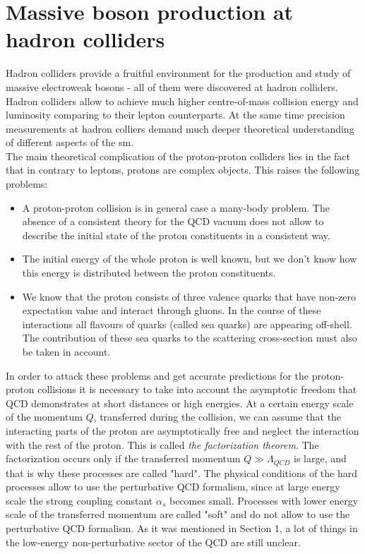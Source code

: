         \section{Massive boson production at hadron colliders}
		Hadron colliders provide a fruitful environment for the production and study of massive electroweak bosons - all of them were discovered at hadron colliders. Hadron colliders allow to achieve much higher centre-of-mass collision energy and luminosity comparing to their lepton counterparts. At the same time precision measurements at hadron colliers demand much deeper theoretical understanding of different aspects of the \gls{sm}. \\
		The main theoretical complication of the proton-proton colliders lies in the fact that in contrary to leptons, protons are complex objects. This raises the following problems:
		\begin{itemize}
		\item A proton-proton collision is in general case a many-body problem. The absence of a consistent theory for the QCD vacuum does not allow to describe the initial state of the proton constituents in a consistent way. 
		\item The initial energy of the whole proton is well known, but we don't know how this energy is distributed between the proton constituents.
		\item We know that the proton consists of three valence quarks that have non-zero expectation value and interact through gluons. In the course of these interactions all flavours of quarks (called sea quarks) are appearing off-shell. The contribution of these sea quarks to the scattering cross-section must also be taken in account.  
		\end{itemize}
		In order to attack these problems and get accurate predictions for the proton-proton collisions it is necessary to take into account the asymptotic freedom that QCD demonstrates at short distances or high energies. At a certain energy scale of the momentum $Q$, transferred during the collision, we can assume that the interacting parts of the proton are asymptotically free and neglect the interaction with the rest of the proton. This is called \textit{the factorization theorem}. The factorization occurs only if the transferred momentum $Q\gg \Lambda_{QCD}$ is large, and that is why these processes are called "hard". The physical conditions of the hard processes allow to use the perturbative QCD formalism, since at large energy scale the strong coupling constant $\alpha_s$ becomes small. Processes with lower energy scale of the transferred momentum are called "soft" and do not allow to use the perturbative QCD formalism. As it was mentioned in Section 1, a lot of things in the low-energy non-perturbative sector of the QCD are still unclear. \\
